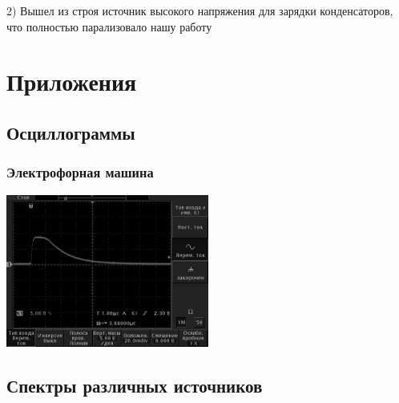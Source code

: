 \documentclass[twocolumn]{article}
\begin{document}
2) Вышел из строя источник высокого напряжения для зарядки
конденсаторов, что полностью парализовало нашу работу
\newpage

\section{Приложения}\subsection{Осциллограммы}\subsubsection{Электрофорная машина}


    
       
    \begin{center}
    \includegraphics[width=0.5\textwidth]{LEMPH Report_files/LEMPH Report_66_0.jpeg}
    \par
    \end{center}
    

            
        
    
\subsection{Спектры различных источников}
        

        \renewcommand{\indexname}{Index}
  

    
\end{document}
